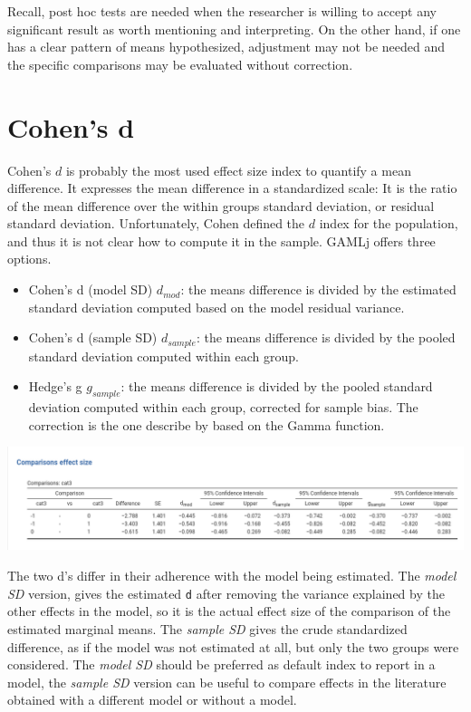 \documentclass[
]{book}
\begin{document}
Recall, post hoc tests are needed when the researcher is willing to accept any significant result as worth mentioning and interpreting. On the other hand, if one has a clear pattern of means hypothesized, adjustment may not be needed and the specific comparisons may be evaluated without correction.

\hypertarget{cohens-d}{%
\section{Cohen's d}\label{cohens-d}}

Cohen's \(d\) is probably the most used effect size index to quantify a mean difference. It expresses the mean difference in a standardized scale: It is the ratio of the mean difference over the within groups standard deviation, or residual standard deviation. Unfortunately, Cohen \citep{cohen2013statistical} defined the \(d\) index for the population, and thus it is not clear how to compute it in the sample. {GAMLj} offers three options.

\begin{itemize}
\item
  Cohen's d (model SD) \(d_{mod}\): the means difference is divided by the estimated standard deviation computed based on the model residual variance.
\item
  Cohen's d (sample SD) \(d_{sample}\): the means difference is divided by the pooled standard deviation computed within each group.
\item
  Hedge's g \(g_{sample}\): the means difference is divided by the pooled standard deviation computed within each group, corrected for sample bias. The correction is the one describe by \citet{hedges2014statistical} based on the Gamma function.
\end{itemize}

\includegraphics[width=14.32in]{bookletpics/2_anova_output8}

The two d's differ in their adherence with the model being estimated. The \emph{model SD} version, gives the estimated \texttt{d} after removing the variance explained by the other effects in the model, so it is the actual effect size of the comparison of the estimated marginal means. The \emph{sample SD} gives the crude standardized difference, as if the model was not estimated at all, but only the two groups were considered. The \emph{model SD} should be preferred as default index to report in a model, the \emph{sample SD} version can be useful to compare effects in the literature obtained with a different model or without a model.
\end{document}
